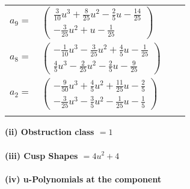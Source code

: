 \documentclass[1p]{elsarticle_modified}
\theoremstyle{definition}
\begin{document}
\begin{tabular}{m{7pt} m{180pt} m{7pt} m{180pt} }
\flushright $a_{9}=$&$\begin{pmatrix}\frac{3}{10} u^3+\frac{8}{25} u^2-\frac{2}{5} u-\frac{14}{25}\\-\frac{3}{25} u^2+u-\frac{1}{25}\end{pmatrix}$ \\
\flushright $a_{8}=$&$\begin{pmatrix}-\frac{1}{10} u^3-\frac{3}{25} u^2+\frac{4}{5} u-\frac{1}{25}\\\frac{4}{5} u^3-\frac{2}{25} u^2-\frac{2}{5} u-\frac{9}{25}\end{pmatrix}$ \\
\flushright $a_{2}=$&$\begin{pmatrix}-\frac{9}{50} u^3+\frac{4}{5} u^2+\frac{11}{25} u-\frac{2}{5}\\-\frac{3}{25} u^3-\frac{3}{5} u^2-\frac{1}{25} u-\frac{1}{5}\end{pmatrix}$\\&\end{tabular}
\flushleft \textbf{(ii) Obstruction class $= 1$}\\~\\
\flushleft \textbf{(iii) Cusp Shapes $= 4 u^2+4$}\\~\\
\newpage\renewcommand{\arraystretch}{1}
\flushleft \textbf{(iv) u-Polynomials at the component}\newline \\
\end{document}
